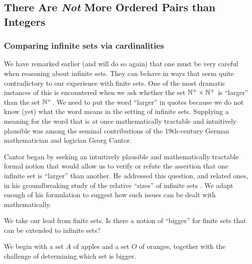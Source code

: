 \subsection{There Are {\em Not} More Ordered Pairs than Integers}
\label{sec:cardinality-NxN}

\subsubsection{Comparing infinite sets via cardinalities}
\label{sec:compare-sets-via-card}

We have remarked earlier (and will do so again) that one must be very
careful when reasoning about infinite sets.  They can behave in ways
that seem quite contradictory to our experience with finite sets.  One
of the most dramatic instances of this is encountered when we ask
whether the set $\mathbb{N}^+ \times \mathbb{N}^+$ is ``larger'' than the set $\mathbb{N}^+$.
We need to put the word ``larger'' in quotes because we do not know
(yet) what the word means in the setting of infinite sets.  Supplying
a meaning for the word that is at once mathematically tractable and
intuitively plausible was among the seminal contributions of the
19th-century German mathematician and logician Georg
Cantor. 


    

Cantor began by seeking an intuitively plausible and mathematically
tractable formal notion that would allow us to verify or refute the
assertion that one infinite set is ``larger'' than another.  He
addressed this question, and related ones, in his groundbreaking study
of the relative ``sizes'' of infinite sets \cite{Cantor74,Cantor78}.
We adapt enough of his formulation to suggest how such issues can be
dealt with mathematically.

We take our lead from finite sets.  Is there a notion of ``bigger''
for finite sets that can be extended to infinite sets?

We begin with a set $A$ of apples and a set $O$ of oranges, together
with the challenge of determining which set is bigger.

